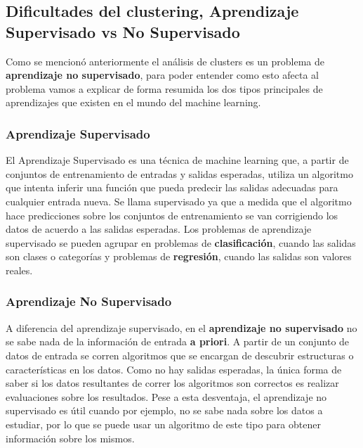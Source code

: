 \documentclass[11pt,a4paper]{article}
\begin{document}
\subsection{Dificultades del clustering, Aprendizaje Supervisado vs No Supervisado}
Como se mencionó anteriormente el análisis de clusters es un problema de \textbf{aprendizaje no supervisado}, para poder entender como esto afecta al problema vamos a explicar de forma resumida los dos tipos principales de aprendizajes que existen en el mundo del machine learning.

\subsubsection*{Aprendizaje Supervisado}
El Aprendizaje Supervisado es una técnica de machine learning que, a partir de conjuntos de entrenamiento de entradas y salidas esperadas, utiliza un algoritmo que intenta inferir una función que pueda predecir las salidas adecuadas para cualquier entrada nueva. Se llama supervisado ya que a medida que el algoritmo hace predicciones sobre los conjuntos de entrenamiento se van corrigiendo los datos de acuerdo a las salidas esperadas. Los problemas de aprendizaje supervisado se pueden agrupar en problemas de \textbf{clasificación}, cuando las salidas son clases o categorías y problemas de \textbf{regresión}, cuando las salidas son valores reales.

\subsubsection*{Aprendizaje No Supervisado}
A diferencia del aprendizaje supervisado, en el \textbf{aprendizaje no supervisado} no se sabe nada de la información de entrada \textbf{a priori}. A partir de un conjunto de datos de entrada se corren algoritmos que se encargan de descubrir estructuras o características en los datos. Como no hay salidas esperadas, la única forma de saber si los datos resultantes de correr los algoritmos son correctos es realizar evaluaciones sobre los resultados. Pese a esta desventaja, el aprendizaje no supervisado es útil cuando por ejemplo, no se sabe nada sobre los datos a estudiar, por lo que se puede usar un algoritmo de este tipo para obtener información sobre los mismos.
\end{document}
